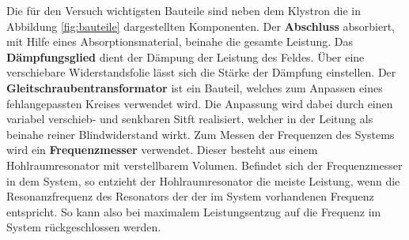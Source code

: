 Die für den Versuch wichtigsten Bauteile sind neben dem Klystron die in Abbildung \ref{fig:bauteile} dargestellten Komponenten.
Der \textbf{Abschluss} absorbiert, mit Hilfe eines Absorptionsmaterial, beinahe die gesamte Leistung. 
Das \textbf{Dämpfungsglied} dient der Dämpung der Leistung des Feldes. Über eine verschiebare Widerstandsfolie lässt sich die Stärke der Dämpfung einstellen. 
Der \textbf{Gleitschraubentransformator} ist ein Bauteil, welches zum Anpassen eines fehlangepassten Kreises verwendet wird. Die Anpassung wird dabei durch einen variabel verschieb- und senkbaren Sitft realisiert, welcher in der Leitung als beinahe reiner Blindwiderstand wirkt.
Zum Messen der Frequenzen des Systems wird ein \textbf{Frequenzmesser} verwendet. Dieser besteht aus einem Hohlraumresonator mit verstellbarem Volumen. Befindet sich der Frequenzmesser in dem System, so entzieht der Hohlraumresonator die meiste Leistung, wenn die Resonanzfrequenz des Resonators der der im System vorhandenen Frequenz entspricht. So kann also bei maximalem Leistungsentzug auf die Frequenz im System rückgeschlossen werden.










